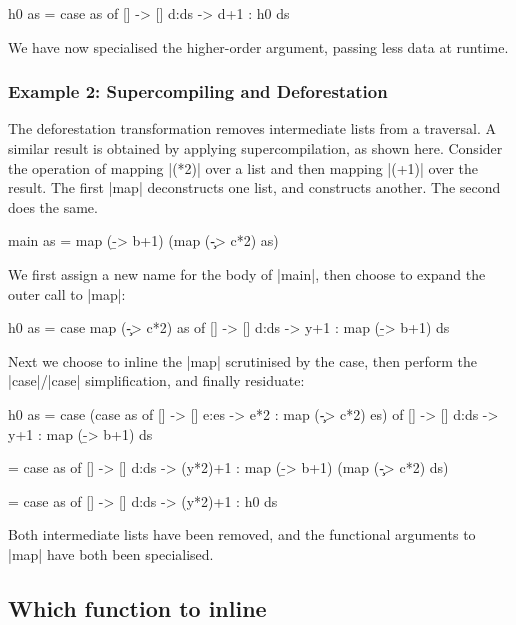 \begin{code}
h0 as = case  as of
              []    -> []
              d:ds  -> d+1 : h0 ds
\end{code}

We have now specialised the higher-order argument, passing less data at runtime.\noexample

\subsubsection{Example 2: Supercompiling and Deforestation}\hfill

The deforestation transformation \cite{wadler:deforestation} removes intermediate lists from a traversal. A similar result is obtained by applying supercompilation, as shown here. Consider the operation of mapping |(*2)| over a list and then mapping |(+1)| over the result. The first |map| deconstructs one list, and constructs another. The second does the same.

\begin{code}
main as = map (\b -> b+1) (map (\c -> c*2) as)
\end{code}

We first assign a new name for the body of |main|, then choose to expand the outer call to |map|:

\begin{code}
h0 as = case  map (\c -> c*2) as of
              []    -> []
              d:ds  -> y+1 : map (\b -> b+1) ds
\end{code}

Next we choose to inline the |map| scrutinised by the case, then perform the |case|/|case| simplification, and finally residuate:

\begin{code}
h0 as  = case  (case  as of
                      []    -> []
                      e:es  -> e*2 : map (\c -> c*2) es) of
               []    -> []
               d:ds  -> y+1 : map (\b -> b+1) ds

       = case  as of
               []    -> []
               d:ds  -> (y*2)+1 : map (\b -> b+1) (map (\c -> c*2) ds)

       = case  as of
               []    -> []
               d:ds  -> (y*2)+1 : h0 ds
\end{code}

Both intermediate lists have been removed, and the functional arguments to |map| have both been specialised.  \noexample

\subsection{Which function to inline}

